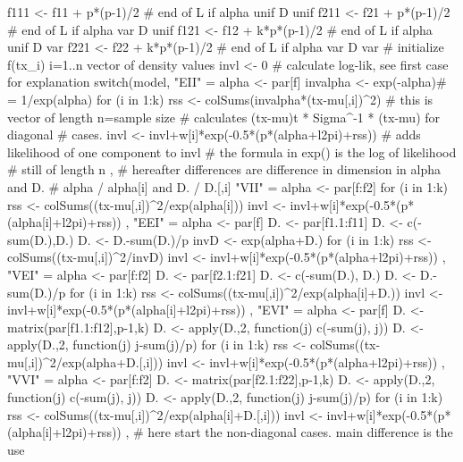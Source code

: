 \begin{Schunk}
\begin{Soutput}
{    f111 <- f11 +   p*(p-1)/2 # end of L if alpha unif  D unif
    f211 <- f21 +   p*(p-1)/2 # end of L if alpha var   D unif
    f121 <- f12 + k*p*(p-1)/2 # end of L if alpha unif  D var
    f221 <- f22 + k*p*(p-1)/2 # end of L if alpha var   D var
    # initialize f(tx_i) i=1..n  vector of density values
    invl <- 0
    # calculate log-lik, see first case for explanation
    switch(model,
    "EII" = {
        alpha <- par[f]
        invalpha <- exp(-alpha)# = 1/exp(alpha)
        for (i in 1:k) {
            rss <- colSums(invalpha*(tx-mu[,i])^2)
            # this is vector of length n=sample size
            # calculates (tx-mu)t * Sigma^-1 * (tx-mu) for diagonal
            # cases.
            invl <- invl+w[i]*exp(-0.5*(p*(alpha+l2pi)+rss))
            # adds likelihood of one component to invl
            # the formula in exp() is the log of likelihood
            # still of length n
        }
    },
    # hereafter differences are difference in dimension in alpha and D.
    # alpha / alpha[i] and D. / D.[,i]
    "VII" = {
        alpha <- par[f:f2]
        for (i in 1:k) {
            rss <- colSums((tx-mu[,i])^2/exp(alpha[i]))
            invl <- invl+w[i]*exp(-0.5*(p*(alpha[i]+l2pi)+rss))
        }
    },
    "EEI" = {
        alpha <- par[f]
        D. <- par[f1.1:f11]
        D. <- c(-sum(D.),D.)
        D. <- D.-sum(D.)/p
        invD <- exp(alpha+D.)
        for (i in 1:k) {
            rss <- colSums((tx-mu[,i])^2/invD)
            invl <- invl+w[i]*exp(-0.5*(p*(alpha+l2pi)+rss))
        }
    },
    "VEI" = {
        alpha <- par[f:f2]
        D. <- par[f2.1:f21]
        D. <- c(-sum(D.), D.)
        D. <- D.-sum(D.)/p
        for (i in 1:k) {
            rss <- colSums((tx-mu[,i])^2/exp(alpha[i]+D.))
            invl <- invl+w[i]*exp(-0.5*(p*(alpha[i]+l2pi)+rss))
        }
    },
    "EVI" = {
        alpha <- par[f]
        D. <- matrix(par[f1.1:f12],p-1,k)
        D. <- apply(D.,2, function(j) c(-sum(j), j))
        D. <- apply(D.,2, function(j) j-sum(j)/p)
        for (i in 1:k) {
            rss <- colSums((tx-mu[,i])^2/exp(alpha+D.[,i]))
            invl <- invl+w[i]*exp(-0.5*(p*(alpha+l2pi)+rss))
        }
    },
    "VVI" = {
        alpha <- par[f:f2]
        D. <- matrix(par[f2.1:f22],p-1,k)
        D. <- apply(D.,2, function(j) c(-sum(j), j))
        D. <- apply(D.,2, function(j) j-sum(j)/p)
        for (i in 1:k) {
            rss <- colSums((tx-mu[,i])^2/exp(alpha[i]+D.[,i]))
            invl <- invl+w[i]*exp(-0.5*(p*(alpha[i]+l2pi)+rss))
        }
    },
    # here start the non-diagonal cases. main difference is the use
}
\end{Soutput}
\end{Schunk}
